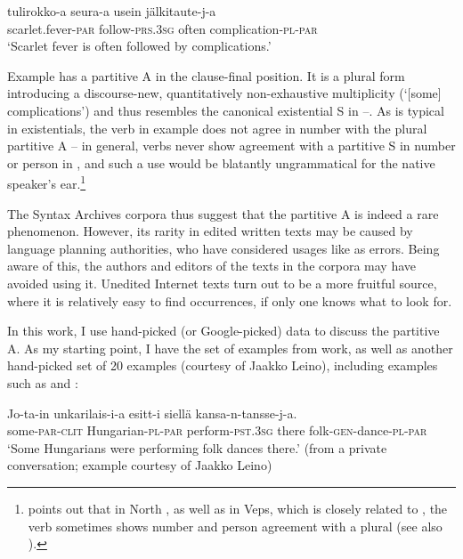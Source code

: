 \documentclass[output=paper]{LSP/langsci}
\begin{document}
\ea%
\label{15-hu-ex:8}

\gll tulirokko-a seura-a usein jälkitaute-j-a\\
scarlet.fever-\textsc{par} follow-\textsc{prs}.\textsc{3sg} often complication-\textsc{pl}-\textsc{par}\\
\glt ‘Scarlet fever is often followed by complications.’
\z


Example  has a partitive A in the clause-final position. It is a plural form introducing a discourse-new, quantitatively non-exhaustive multiplicity (‘[some] complications’) and thus resembles the canonical existential S in --. As is typical in existentials, the verb in example  does not agree in number with the plural partitive A – in general, verbs never show agreement with a partitive S in number or person in , and such a use would be blatantly ungrammatical for the native speaker’s ear.\footnote{\citet[395]{Serzant2015Independent} points out that in North , as well as in Veps, which is closely related to , the verb sometimes shows number and person agreement with a plural  (see also \citealt{Koptjevskaja-Tammetal2001Circum}).} 

The Syntax Archives corpora thus suggest that the partitive A is indeed a rare phenomenon. However, its rarity in edited written texts may be caused by language planning authorities, who have considered usages like  as errors. Being aware of this, the authors and editors of the texts in the corpora may have avoided using it. Unedited Internet texts turn out to be a more fruitful source, where it is relatively easy to find occurrences, if only one knows what to look for.  

In this work, I use hand-picked (or Google-picked) data to discuss the partitive A. As my starting point, I have the set of examples from  work, as well as another hand-picked set of 20 examples (courtesy of Jaakko Leino), including examples such as  and :

\ea\label{15-hu-ex:9}
\gll Jo-ta-in unkarilais-i-a esitt-i siellä kansa-n-tansse-j-a.\\
some-\textsc{par}-\textsc{clit} Hungarian-\textsc{pl}-\textsc{par} perform-\textsc{pst}.\textsc{3sg} there folk-\textsc{gen}-dance-\textsc{pl}-\textsc{par}\\
\glt `Some Hungarians were performing folk dances there.’ (from a private conversation; example courtesy of Jaakko Leino)
\z
\end{document}
